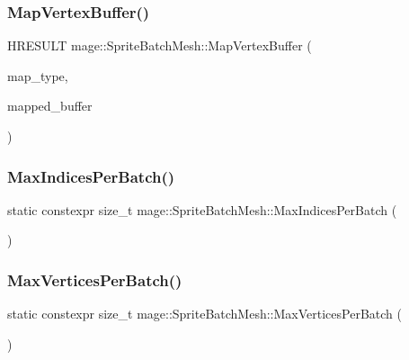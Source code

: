 \subsubsection{\texorpdfstring{Map\+Vertex\+Buffer()}{MapVertexBuffer()}}
{\footnotesize\ttfamily H\+R\+E\+S\+U\+LT mage\+::\+Sprite\+Batch\+Mesh\+::\+Map\+Vertex\+Buffer (\begin{DoxyParamCaption}\item[{D3\+D11\+\_\+\+M\+AP}]{map\+\_\+type,  }\item[{D3\+D11\+\_\+\+M\+A\+P\+P\+E\+D\+\_\+\+S\+U\+B\+R\+E\+S\+O\+U\+R\+CE $\ast$}]{mapped\+\_\+buffer }\end{DoxyParamCaption})}

\hypertarget{classmage_1_1_sprite_batch_mesh_ad0957bf93f8d23916a4e25bd549b5127}{}\label{classmage_1_1_sprite_batch_mesh_ad0957bf93f8d23916a4e25bd549b5127} 
\subsubsection{\texorpdfstring{Max\+Indices\+Per\+Batch()}{MaxIndicesPerBatch()}}
{\footnotesize\ttfamily static constexpr size\+\_\+t mage\+::\+Sprite\+Batch\+Mesh\+::\+Max\+Indices\+Per\+Batch (\begin{DoxyParamCaption}{ }\end{DoxyParamCaption})\hspace{0.3cm}{\ttfamily [static]}}

\hypertarget{classmage_1_1_sprite_batch_mesh_aa4253546e06f3faac0d8287d894a5655}{}\label{classmage_1_1_sprite_batch_mesh_aa4253546e06f3faac0d8287d894a5655} 
\subsubsection{\texorpdfstring{Max\+Vertices\+Per\+Batch()}{MaxVerticesPerBatch()}}
{\footnotesize\ttfamily static constexpr size\+\_\+t mage\+::\+Sprite\+Batch\+Mesh\+::\+Max\+Vertices\+Per\+Batch (\begin{DoxyParamCaption}{ }\end{DoxyParamCaption})\hspace{0.3cm}{\ttfamily [static]}}

